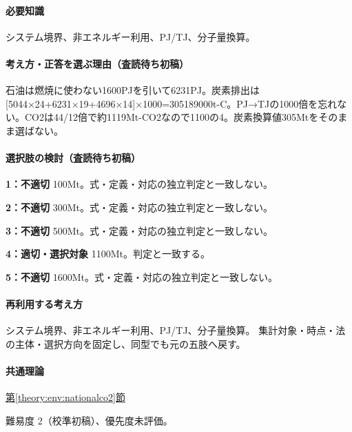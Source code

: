 \paragraph{必要知識} システム境界、非エネルギー利用、PJ/TJ、分子量換算。

\paragraph{考え方・正答を選ぶ理由（査読待ち初稿）} 石油は燃焼に使わない1600PJを引いて6231PJ。炭素排出は[5044×24+6231×19+4696×14]×1000=\allowbreak{}305189000t-C。PJ→TJの1000倍を忘れない。CO2は44/12倍で約1119Mt-CO2なので1100の4。炭素換算値305Mtをそのまま選ばない。

\paragraph{選択肢の検討（査読待ち初稿）}\mbox{}\par

\noindent\textbf{1：不適切} 100Mt。式・定義・対応の独立判定と一致しない。\par

\noindent\textbf{2：不適切} 300Mt。式・定義・対応の独立判定と一致しない。\par

\noindent\textbf{3：不適切} 500Mt。式・定義・対応の独立判定と一致しない。\par

\noindent\textbf{4：適切・選択対象} 1100Mt。判定と一致する。\par

\noindent\textbf{5：不適切} 1600Mt。式・定義・対応の独立判定と一致しない。\par

\paragraph{再利用する考え方} システム境界、非エネルギー利用、PJ/TJ、分子量換算。 集計対象・時点・法の主体・選択方向を固定し、同型でも元の五肢へ戻す。

\paragraph{共通理論} \hyperref[theory:env:nationalco2]{第\ref*{theory:env:nationalco2}節}

\par 難易度 2（校準初稿）、優先度未評価。

